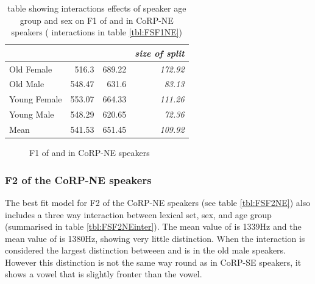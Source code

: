 \documentclass[../../../00.FullDoc/tex/ThesisSkeleton-draft2]{subfiles}
\begin{document}



\begin{table}[htbp]
	\centering
	\begin{tabular}{lrrr}
		\hline
		& \multicolumn{1}{l}{\foot{}} & \multicolumn{1}{l}{\strutt{}} & \multicolumn{1}{l}{\textit{size of split}} \\
		\hline
		Old Female & 516.3 & 689.22 & \textit{172.92} \\
		Old Male & 548.47 & 631.6 & \textit{83.13} \\
		Young Female & 553.07 & 664.33 & \textit{111.26} \\
		Young Male & 548.29 & 620.65 & \textit{72.36} \\
		Mean  & 541.53 & 651.45 & \textit{109.92} \\
		\hline
	\end{tabular}%
	\caption{table showing interactions effects of speaker age group and sex on F1 of \foot{} and \strutt{} in CoRP-NE speakers ( interactions in table \ref{tbl:FSF1NE})}
	\label{tbl:FSF1NEinter}%
\end{table}%

\begin{figure}[h]
	
	\caption{F1 of \foot{} and \strutt{} in CoRP-NE speakers} \label{fig:FSF1NE}
\end{figure}


\subsubsection{F2 of the CoRP-NE speakers} \label{subsubsec:NEF2}
The best fit model for F2 of the CoRP-NE speakers (see table \ref{tbl:FSF2NE}) also includes a three way interaction between lexical set, sex, and age group (summarised in table \ref{tbl:FSF2NEinter}). The mean value of \foot{} is 1339Hz and the mean value of \strutt{} is 1380Hz, showing very little distinction. When the interaction is considered the largest distinction betweeen \foot{} and \strutt is in the old male speakers. However this distinction is not the same way round as in CoRP-SE speakers, it shows a \strutt{} vowel that is slightly fronter than the \foot{} vowel.


\end{document}
